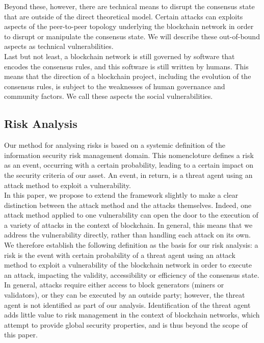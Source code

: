 \documentclass[12pt,a4paper]{article}
\begin{document}
Beyond these, however, there are technical means to disrupt the consensus state that are outside of the direct theoretical model. Certain attacks can exploits aspects of the peer-to-peer topology underlying the blockchain network in order to disrupt or manipulate the consensus state. We will describe these out-of-bound aspects as technical vulnerabilities.\\

Last but not least, a blockchain network is still governed by software that encodes the consensus rules, and this software is still written by humans. This means that the direction of a blockchain project, including the evolution of the consensus rules, is subject to the weaknesses of human governance and community factors. We call these aspects the social vulnerabilities.\\

\subsection{Risk Analysis}

Our method for analysing risks is based on a systemic definition of the information security risk management domain. This nomencloture defines a risk as an event, occurring with a certain probability, leading to a certain impact on the security criteria of our asset. An event, in return, is a threat agent using an attack method to exploit a vulnerability.\\

In this paper, we propose to extend the framework slightly to make a clear distinction between the attack method and the attacks themselves. Indeed, one attack method applied to one vulnerability can open the door to the execution of a variety of attacks in the context of blockchain. In general, this means that we address the vulnerability directly, rather than handling each attack on its own.\\

We therefore establish the following definition as the basis for our risk analysis: a risk is the event with certain probability of a threat agent using an attack method to exploit a vulnerability of the blockchain network in order to execute an attack, impacting the validity, accessibility or efficiency of the consensus state.\\

In general, attacks require either access to block generators (miners or validators), or they can be executed by an outside party; however, the threat agent is not identified as part of our analysis. Identification of the threat agent adds little value to risk management in the context of blockchain networks, which attempt to provide global security properties, and is thus beyond the scope of this paper.\\
\end{document}
